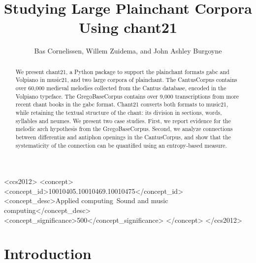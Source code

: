 \documentclass[sigconf,screen]{acmart}
\begin{document}
\title{%
Studying Large Plainchant Corpora Using chant21
}

\author{Bas Cornelissen, Willem Zuidema, and John Ashley Burgoyne}
\renewcommand{\shortauthors}{Cornelissen, Zuidema and Burgoyne}


\begin{abstract}
  We present chant21, a Python package to support the plainchant formats gabc and Volpiano in music21, and two large corpora of plainchant.
  The CantusCorpus contains over 60,000 medieval melodies collected from the Cantus database, encoded in the Volpiano typeface.
  The GregoBaseCorpus contains over 9,000 transcriptions from more recent chant books in the gabc format.
  Chant21 converts both formats to music21, while retaining the textual structure of the chant: its division in sections, words, syllables and neumes.
  We present two case studies.
  First, we report evidence for the melodic arch hypothesis from the GregoBaseCorpus.
  Second, we analyze connections between differentiæ and antiphon openings in the CantusCorpus, and show that the systematicity of the connection can be quantified using an entropy-based measure.
\end{abstract}

\begin{CCSXML}
<ccs2012>
<concept>
<concept_id>10010405.10010469.10010475</concept_id>
<concept_desc>Applied computing~Sound and music computing</concept_desc>
<concept_significance>500</concept_significance>
</concept>
</ccs2012>
\end{CCSXML}



\maketitle



\section{Introduction}
\end{document}
